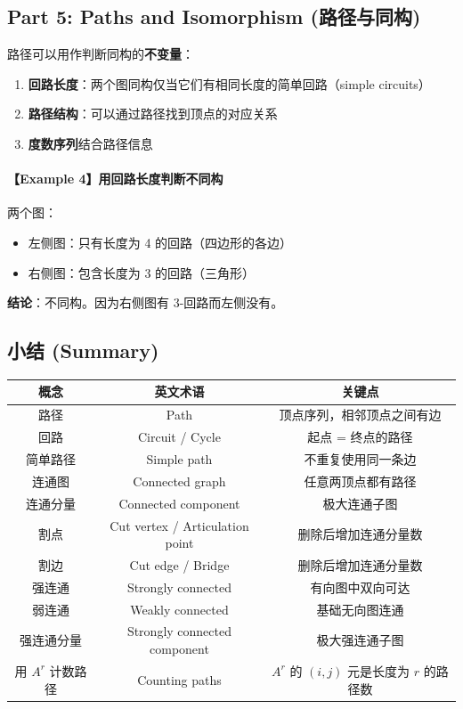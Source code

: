 \documentclass[10pt,a4paper,openany]{ctexbook}
\theoremstyle{definition}
\theoremstyle{remark}
\begin{document}
\vspace{-2pt}

\subsection{Part 5: Paths and Isomorphism (路径与同构)}

路径可以用作判断同构的\textbf{不变量}：
\begin{enumerate}
\item \textbf{回路长度}：两个图同构仅当它们有相同长度的简单回路（simple circuits）
\item \textbf{路径结构}：可以通过路径找到顶点的对应关系
\item \textbf{度数序列}结合路径信息

\end{enumerate}

\paragraph{【Example 4】用回路长度判断不同构}

两个图：
\begin{itemize}
\item 左侧图：只有长度为 4 的回路（四边形的各边）
\item 右侧图：包含长度为 3 的回路（三角形）

\end{itemize}

\textbf{结论}：不同构。因为右侧图有 3-回路而左侧没有。
\vspace{-2pt}

\subsection{小结 (Summary)}

\begin{center}
\begin{tabular}{ccc}
\hline
概念 & 英文术语 & 关键点 \\ \hline
路径 & Path & 顶点序列，相邻顶点之间有边 \\
回路 & Circuit / Cycle & 起点 = 终点的路径 \\
简单路径 & Simple path & 不重复使用同一条边 \\
连通图 & Connected graph & 任意两顶点都有路径 \\
连通分量 & Connected component & 极大连通子图 \\
割点 & Cut vertex / Articulation point & 删除后增加连通分量数 \\
割边 & Cut edge / Bridge & 删除后增加连通分量数 \\
强连通 & Strongly connected & 有向图中双向可达 \\
弱连通 & Weakly connected & 基础无向图连通 \\
强连通分量 & Strongly connected component & 极大强连通子图 \\
用 $A^r$ 计数路径 & Counting paths & $A^r$ 的 $(i,j)$ 元是长度为 $r$ 的路径数 \\
\hline
\end{tabular}

\end{center}
\end{document}
